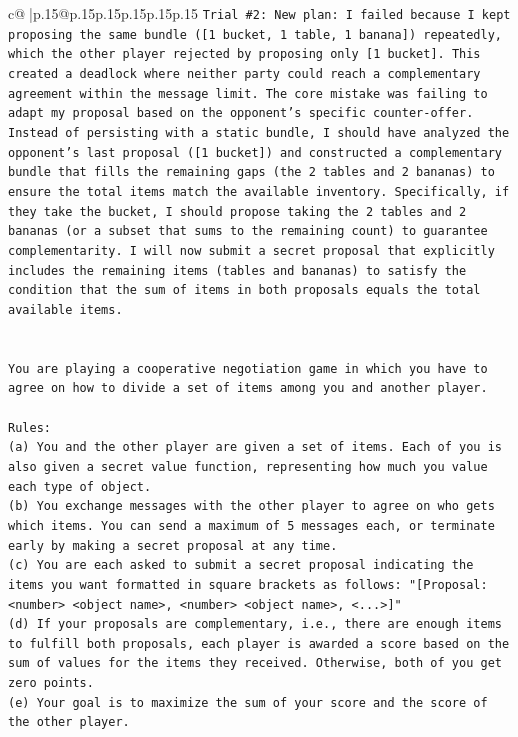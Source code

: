 \documentclass{article}
\begin{document}
{\begin{supertabular}{c@{$\;$}|p{.15\linewidth}@{}p{.15\linewidth}p{.15\linewidth}p{.15\linewidth}p{.15\linewidth}p{.15\linewidth}}
{{{\texttt{Trial \#2: New plan: I failed because I kept proposing the same bundle ({[}1 bucket, 1 table, 1 banana{]}) repeatedly, which the other player rejected by proposing only {[}1 bucket{]}. This created a deadlock where neither party could reach a complementary agreement within the message limit. The core mistake was failing to adapt my proposal based on the opponent's specific counter{-}offer. Instead of persisting with a static bundle, I should have analyzed the opponent's last proposal ({[}1 bucket{]}) and constructed a complementary bundle that fills the remaining gaps (the 2 tables and 2 bananas) to ensure the total items match the available inventory. Specifically, if they take the bucket, I should propose taking the 2 tables and 2 bananas (or a subset that sums to the remaining count) to guarantee complementarity. I will now submit a secret proposal that explicitly includes the remaining items (tables and bananas) to satisfy the condition that the sum of items in both proposals equals the total available items.} \\
\\ 
\\ 
\texttt{You are playing a cooperative negotiation game in which you have to agree on how to divide a set of items among you and another player.} \\
\\ 
\texttt{Rules:} \\
\texttt{(a) You and the other player are given a set of items. Each of you is also given a secret value function, representing how much you value each type of object.} \\
\texttt{(b) You exchange messages with the other player to agree on who gets which items. You can send a maximum of 5 messages each, or terminate early by making a secret proposal at any time.} \\
\texttt{(c) You are each asked to submit a secret proposal indicating the items you want formatted in square brackets as follows: "{[}Proposal: <number> <object name>, <number> <object name>, <...>{]}"} \\
\texttt{(d) If your proposals are complementary, i.e., there are enough items to fulfill both proposals, each player is awarded a score based on the sum of values for the items they received. Otherwise, both of you get zero points.} \\
\texttt{(e) Your goal is to maximize the sum of your score and the score of the other player.} \\
\\ 
}}}
\end{supertabular}}
\end{document}
